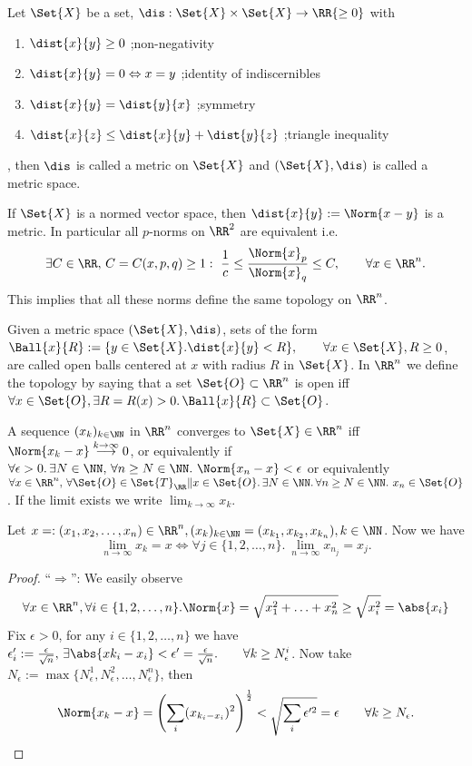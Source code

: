 \begin{defn}
 Let $\Set{X}$ be a set, $\dis:\Set{X}\times\Set{X}\to\RR{\geq 0}$ with 
 \begin{enumerate}
 \item $\dist{x}{y} \geq 0$ \qquad ;non-negativity
  \item $\dist{x}{y}=0\Leftrightarrow x=y$ \qquad ;identity of indiscernibles
  \item $\dist{x}{y}=\dist{y}{x}$ \qquad ;symmetry
  \item $\dist{x}{z}\leq \dist{x}{y}+\dist{y}{z}$ \qquad ;triangle inequality
 \end{enumerate}, then $\dis$ is called a metric on $\Set{X}$ and $(\Set{X}, \dis)$ is called a metric space.
\end{defn}
\begin{exc}
 If $\Set{X}$ is a normed vector space, then $\dist{x}{y}:=\Norm{x-y}$ is a metric. 
 In particular all $p$-norms on $\RR^2$ are equivalent i.e.
 $$\exists C\in\RR,\,C=C(x,p,q)\geq 1:\ \frac{1}{c}\leq\frac{\Norm{x}_p}{\Norm{x}_q}\leq C, \qquad\forall x\in\RR^n.$$
 This implies that all these norms define the same topology on $\RR^n$. 
\end{exc}
\begin{rem}
 Given a metric space $(\Set{X}, \dis)$, sets of the form $\Ball{x}{R}:=\{y\in\Set{X}.\dist{x}{y}<R\}, \qquad\forall x\in\Set{X}, R\geq 0$, are called open balls centered at $x$ with radius $R$ in $\Set{X}$. In $\RR^n$ we define the topology by saying that a set $\Set{O}\subset\RR^n$ is open iff $\forall x\in\Set{O}, \exists R=R(x)>0. \,\Ball{x}{R}\subset\Set{O}$.
\end{rem}
\begin{defn}
 A sequence $(x_k)_{k\in\NN}$ in $\RR^n$ converges to $\Set{X}\in\RR^n$ iff $\Norm{x_k-x}\overset{k\to\infty}{\longrightarrow}0$, or equivalently if $\forall \epsilon>0.\,\exists N\in\NN, \,\forall n\geq N\in\NN.\ \Norm{x_n-x}<\epsilon$ or equivalently $\forall x\in\RR^n,\,\forall \Set{O}\in\Set{T}_{\RR}\|x\in\Set{O}.\,\exists N\in\NN.\,\forall n\geq N\in\NN.\ x_n\in\Set{O}$. If the limit exists we write $\lim_{k\to\infty}x_k$.
\end{defn}
\begin{lem}
 \label{lem:comp}
 Let $x=:(x_1, x_2,\ldots,x_n)\in\RR^n, (x_k)_{k\in\NN}=(x_{k_1},x_{k_2}, x_{k_n}), k\in\NN$.
 Now we have $$\lim_{n\to\infty}x_k=x\Leftrightarrow \forall j\in \{1,2,\ldots,n\}.\ \lim_{n\to\infty}x_{n_j}=x_j.$$
\end{lem}
\begin{proof}
 ``$\Rightarrow$'': We easily observe $$\forall x\in\RR^n, \forall i\in\{1, 2, \ldots,n\}. \Norm{x}=\sqrt{x_1^2+\ldots+x_n^2}\geq \sqrt{x_i ^2}=\abs{x_i}$$
 Fix $\epsilon>0$, for any $i\in\{1, 2, \ldots, n\}$ we have $\epsilon_i':=\frac{\epsilon}{\sqrt{n}},\,\exists\abs{x{k_i}-x_i}<\epsilon'=\frac{\epsilon}{\sqrt{n}}.\qquad\forall k\geq N_{\epsilon}^i$. Now take $N_\epsilon:=\max\{N_{\epsilon}^1, N_{\epsilon}^2, \ldots, N_{\epsilon}^n\}$, then $$\Norm{x_k-x}=\left(\sum_i(x_{k_i-x_i})^2\right)^{\frac{1}{2}}<\sqrt{\sum_i \epsilon'^2}=\epsilon\qquad\forall k\geq N_\epsilon.$$
\end{proof}

